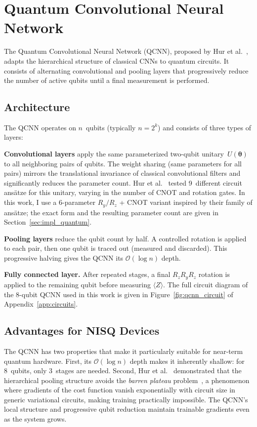\section{Quantum Convolutional Neural Network}
\label{sec:qcnn}

The Quantum Convolutional Neural Network (QCNN), proposed by Hur et al.~\cite{hur2022quantum}, adapts the hierarchical structure of classical CNNs to quantum circuits. It consists of alternating convolutional and pooling layers that progressively reduce the number of active qubits until a final measurement is performed.

\subsection{Architecture}

The QCNN operates on $n$~qubits (typically $n = 2^k$) and consists of three types of layers:

\textbf{Convolutional layers} apply the same parameterized two-qubit unitary~$U(\boldsymbol{\theta})$ to all neighboring pairs of qubits. The weight sharing (same parameters for all pairs) mirrors the translational invariance of classical convolutional filters and significantly reduces the parameter count. Hur et al.~\cite{hur2022quantum} tested 9~different circuit ansätze for this unitary, varying in the number of CNOT and rotation gates. In this work, I use a 6-parameter $R_y/R_z$ + CNOT variant inspired by their family of ansätze; the exact form and the resulting parameter count are given in Section~\ref{sec:impl_quantum}.

\textbf{Pooling layers} reduce the qubit count by half. A controlled rotation is applied to each pair, then one qubit is traced out (measured and discarded). This progressive halving gives the QCNN its $\mathcal{O}(\log n)$ depth.

\textbf{Fully connected layer.} After repeated stages, a final $R_z R_y R_z$ rotation is applied to the remaining qubit before measuring $\langle Z \rangle$. The full circuit diagram of the 8-qubit QCNN used in this work is given in Figure~\ref{fig:qcnn_circuit} of Appendix~\ref{app:circuits}.

\subsection{Advantages for NISQ Devices}

The QCNN has two properties that make it particularly suitable for near-term quantum hardware. First, its $\mathcal{O}(\log n)$ depth makes it inherently shallow: for 8~qubits, only 3~stages are needed. Second, Hur et al.~\cite{hur2022quantum} demonstrated that the hierarchical pooling structure avoids the \emph{barren plateau} problem~\cite{mcclean2018barren}, a phenomenon where gradients of the cost function vanish exponentially with circuit size in generic variational circuits, making training practically impossible. The QCNN's local structure and progressive qubit reduction maintain trainable gradients even as the system grows.

